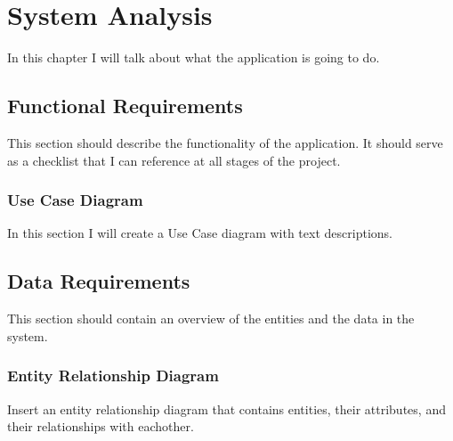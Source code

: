 \chapter{System Analysis}
In this chapter I will talk about what the application is going to do.

\section{Functional Requirements}
This section should describe the functionality of the application. It should serve as a checklist that I can reference at all stages of the project.

\subsection{Use Case Diagram}
In this section I will create a Use Case diagram with text descriptions.

\section{Data Requirements}
This section should contain an overview of the entities and the data in the system.

\subsection{Entity Relationship Diagram}
Insert an entity relationship diagram that contains entities, their attributes, and their relationships with eachother.


